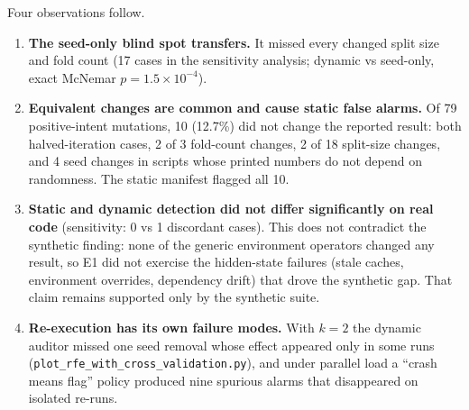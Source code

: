 \documentclass[11pt]{article}
\begin{document}
\begin{table}[t]
\centering\small
\caption{E1: 199 mutation cases on 30 independently written scripts. Truth is the execution oracle. Wilson 95\% intervals.}
\label{tab:e1}
\end{table}

Four observations follow.
\begin{enumerate}
  \item \textbf{The seed-only blind spot transfers.} It missed every changed split size and fold count (17 cases in the sensitivity analysis; dynamic vs seed-only, exact McNemar $p=1.5\times10^{-4}$).
  \item \textbf{Equivalent changes are common and cause static false alarms.} Of 79 positive-intent mutations, 10 (12.7\%) did not change the reported result: both halved-iteration cases, 2 of 3 fold-count changes, 2 of 18 split-size changes, and 4 seed changes in scripts whose printed numbers do not depend on randomness. The static manifest flagged all 10.
  \item \textbf{Static and dynamic detection did not differ significantly on real code} (sensitivity: 0 vs 1 discordant cases). This does not contradict the synthetic finding: none of the generic environment operators changed any result, so E1 did not exercise the hidden-state failures (stale caches, environment overrides, dependency drift) that drove the synthetic gap. That claim remains supported only by the synthetic suite.
  \item \textbf{Re-execution has its own failure modes.} With $k=2$ the dynamic auditor missed one seed removal whose effect appeared only in some runs (\texttt{plot\_rfe\_with\_cross\_validation.py}), and under parallel load a ``crash means flag'' policy produced nine spurious alarms that disappeared on isolated re-runs.
\end{enumerate}
\end{document}

